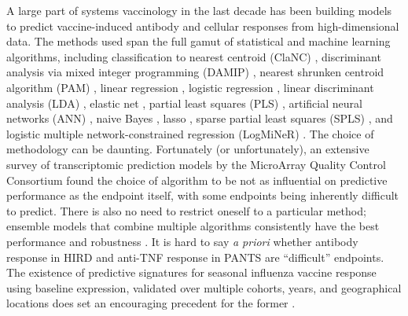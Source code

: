 A large part of systems vaccinology in the last decade has been building models to predict vaccine-induced antibody and cellular responses from high-dimensional data.
The methods used span the full gamut of statistical and machine learning algorithms, including
classification to nearest centroid (ClaNC) \autocite{querec2009SystemsBiologyApproach},
discriminant analysis via mixed integer programming (DAMIP) \autocite{querec2009SystemsBiologyApproach,nakaya2011SystemsBiologyVaccination,nakaya2015SystemsAnalysisImmunity,kazmin2017SystemsAnalysisProtective},
nearest shrunken centroid algorithm (PAM) \autocite{vahey2010ExpressionGenesAssociated},
linear regression \autocite{bucasas2011EarlyPatternsGene,li2017MetabolicPhenotypesResponse},
logistic regression \autocite{haynes2012ImmuneCorrelatesAnalysisHIV1,furman2014SystemsAnalysisSex,tan2014GeneSignaturesRelated},
linear discriminant analysis (LDA) \autocite{zak2012MerckAd5HIV,tsang2014GlobalAnalysesHuman},
elastic net \autocite{furman2013ApoptosisOtherImmune},
partial least squares (PLS) \autocite{tsang2014GlobalAnalysesHuman},
artificial neural networks (ANN) \autocite{nakaya2015SystemsAnalysisImmunity},
naive Bayes \autocite{fourati2016PrevaccinationInflammationBcell},
lasso \autocite{qi2016DefectiveMemoryCell},
sparse partial least squares (SPLS) \autocite{rechtien2017SystemsVaccinologyIdentifies},
and logistic multiple network-constrained regression (LogMiNeR)
\autocite{avey2017MultipleNetworkconstrainedRegressions,avey2020SeasonalVariabilityShared}.
The choice of methodology can be daunting.
Fortunately (or unfortunately), 
an extensive survey of transcriptomic prediction models by the MicroArray Quality Control Consortium \autocite{maqcconsortium2010MicroArrayQualityControl}
found the choice of algorithm to be not as influential on predictive performance as 
the endpoint itself, with some endpoints being inherently difficult to predict.
There is also no need to restrict oneself to a particular method;
ensemble models that combine multiple algorithms consistently have the best performance and robustness \autocite{camacho2018NextGenerationMachineLearning}.
It is hard to say \textit{a priori} whether antibody response in \gls{HIRD} and anti-\gls{TNF} response in \gls{PANTS} are \enquote{difficult} endpoints.
The existence of predictive signatures for seasonal influenza vaccine response using baseline expression, 
validated over multiple cohorts, years, and geographical locations does set an encouraging precedent for the former \autocite{hipc-chisignaturesprojectteam2017MulticohortAnalysisReveals}.
%

